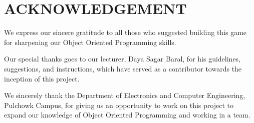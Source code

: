 \newpage
\section*{ACKNOWLEDGEMENT}

We express our sincere gratitude to all those who suggested building this game for sharpening our Object Oriented Programming skills.

\vspace{5mm}
Our special thanks goes to our lecturer, Daya Sagar Baral, for his guidelines, suggestions, and instructions, which have served as a contributor towards the inception of this project.

\vspace{5mm}
We sincerely thank the Department of Electronics and Computer Engineering, Pulchowk Campus, for giving us an opportunity to work on this project to expand our knowledge of Object Oriented Programming and working in a team.
